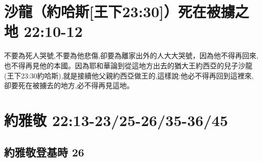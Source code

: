 \section{沙龍（約哈斯[王下23:30]）死在被擄之地 22:10-12}
不要為死人哭號,不要為他悲傷,卻要為離家出外的人大大哭號，因為他不得再回來,也不得再見他的本國。因為耶和華論到從這地方出去的猶大王約西亞的兒子沙龍(王下23:30約哈斯),就是接續他父親約西亞做王的,這樣說:他必不得再回到這裡來,卻要死在被擄去的地方,必不得再見這地。


\section{約雅敬 22:13-23/25-26/35-36/45}
\subsection{約雅敬登基時 26}
